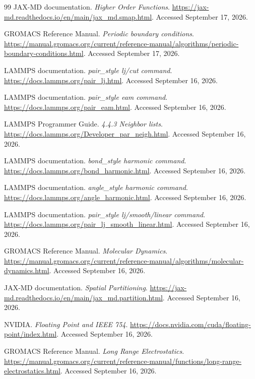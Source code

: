 \documentclass[11pt,a4paper]{article}
\theoremstyle{definition}
\begin{document}
\begin{thebibliography}{99}
JAX-MD documentation. \emph{Higher Order Functions}.
\url{https://jax-md.readthedocs.io/en/main/jax_md.smap.html}.
Accessed September 17, 2026.

GROMACS Reference Manual. \emph{Periodic boundary conditions}.
\url{https://manual.gromacs.org/current/reference-manual/algorithms/periodic-boundary-conditions.html}.
Accessed September 17, 2026.

LAMMPS documentation. \emph{pair\_style lj/cut command}.
\url{https://docs.lammps.org/pair_lj.html}.
Accessed September 16, 2026.

LAMMPS documentation. \emph{pair\_style eam command}.
\url{https://docs.lammps.org/pair_eam.html}.
Accessed September 16, 2026.

LAMMPS Programmer Guide. \emph{4.4.3 Neighbor lists}.
\url{https://docs.lammps.org/Developer_par_neigh.html}.
Accessed September 16, 2026.

LAMMPS documentation. \emph{bond\_style harmonic command}.
\url{https://docs.lammps.org/bond_harmonic.html}.
Accessed September 16, 2026.

LAMMPS documentation. \emph{angle\_style harmonic command}.
\url{https://docs.lammps.org/angle_harmonic.html}.
Accessed September 16, 2026.

LAMMPS documentation. \emph{pair\_style lj/smooth/linear command}.
\url{https://docs.lammps.org/pair_lj_smooth_linear.html}.
Accessed September 16, 2026.

GROMACS Reference Manual. \emph{Molecular Dynamics}.
\url{https://manual.gromacs.org/current/reference-manual/algorithms/molecular-dynamics.html}.
Accessed September 16, 2026.

JAX-MD documentation. \emph{Spatial Partitioning}.
\url{https://jax-md.readthedocs.io/en/main/jax_md.partition.html}.
Accessed September 16, 2026.

NVIDIA. \emph{Floating Point and IEEE 754}.
\url{https://docs.nvidia.com/cuda/floating-point/index.html}.
Accessed September 16, 2026.

GROMACS Reference Manual. \emph{Long Range Electrostatics}.
\url{https://manual.gromacs.org/current/reference-manual/functions/long-range-electrostatics.html}.
Accessed September 16, 2026.
\end{thebibliography}
\appendix
{}
\end{document}
